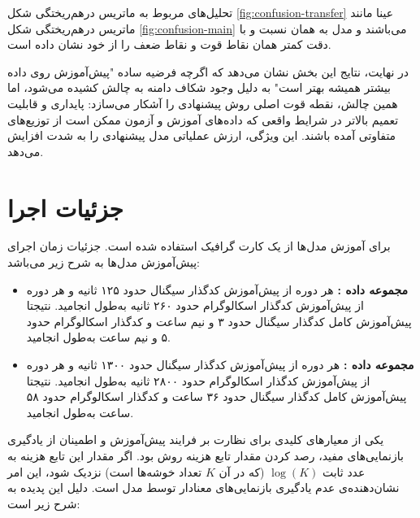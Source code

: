 تحلیل‌های مربوط به ماتریس درهم‌ریختگی شکل \ref{fig:confusion-transfer} عینا مانند ماتریس درهم‌ریختگی شکل \ref{fig:confusion-main} می‌باشند و مدل به همان نسبت و با دقت کمتر همان نقاط قوت و نقاط ضعف را از خود نشان داده است.

در نهایت، نتایج این بخش نشان می‌دهد که اگرچه فرضیه ساده "پیش‌آموزش روی داده بیشتر همیشه بهتر است" به دلیل وجود شکاف دامنه به چالش کشیده می‌شود، اما همین چالش، نقطه قوت اصلی روش پیشنهادی را آشکار می‌سازد: پایداری و قابلیت تعمیم بالاتر در شرایط واقعی که داده‌های آموزش و آزمون ممکن است از توزیع‌های متفاوتی آمده باشند. این ویژگی، ارزش عملیاتی مدل پیشنهادی را به شدت افزایش می‌دهد.

\section{جزئیات اجرا}

برای آموزش مدل‌ها از یک کارت گرافیک  استفاده شده است. جزئیات زمان اجرای پیش‌آموزش مدل‌ها به شرح زیر می‌باشد:
\begin{itemize}
    \item \textbf{مجموعه داده :} هر دوره از پیش‌آموزش کدگذار سیگنال حدود ۱۲۵ ثانیه و هر دوره از پیش‌آموزش کدگذار اسکالوگرام حدود ۲۶۰ ثانیه به‌طول انجامید. نتیجتا پیش‌آموزش کامل کدگذار سیگنال حدود ۳ و نیم ساعت و کدگذار اسکالوگرام حدود ۵ و نیم ساعت به‌طول انجامید.
    \item \textbf{مجموعه داده :} هر دوره از پیش‌آموزش کدگذار سیگنال حدود ۱۳۰۰ ثانیه و هر دوره از پیش‌آموزش کدگذار اسکالوگرام حدود ۲۸۰۰ ثانیه به‌طول انجامید. نتیجتا پیش‌آموزش کامل کدگذار سیگنال حدود ۳۶ ساعت و کدگذار اسکالوگرام حدود ۵۸ ساعت به‌طول انجامید.
\end{itemize}

یکی از معیارهای کلیدی برای نظارت بر فرایند پیش‌آموزش و اطمینان از یادگیری بازنمایی‌های مفید، رصد کردن مقدار تابع هزینه روش  بود. اگر مقدار این تابع هزینه به عدد ثابت
$\log(K)$ (که در آن $K$ تعداد خوشه‌ها است) نزدیک شود، این امر نشان‌دهنده‌ی عدم یادگیری بازنمایی‌های معنادار توسط مدل است. دلیل این پدیده به شرح زیر است:

